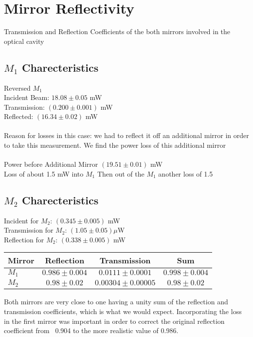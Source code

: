 \documentclass[11pt]{article}
\begin{document}
\section{Mirror Reflectivity}
Transmission and Reflection Coefficients of the both mirrors involved in the optical cavity \\
\subsection{$M_1$ Charecteristics}
Reversed $M_1$ \\ 
Incident Beam:
$18.08 \pm 0.05$ mW \\
Transmission:
$(0.200 \pm 0.001 )$ mW \\
Reflected: 
$(16.34 \pm 0.02)$ mW \\ \ \\
Reason for losses in this case: we had to reflect it off an additional mirror in order to take this measurement. We find the power loss of this additional mirror \\ \ \\ 
Power before Additional Mirror
$(19.51 \pm 0.01)$ mW \\
Loss of about 1.5 mW into $M_1$ 
Then out of the $M_1$ another loss of 1.5 \\
\subsection{$M_2$ Charecteristics}
Incident for $M_2$:
$(0.345 \pm 0.005)$ mW \\
Transmission for $M_2$:
$(1.05 \pm 0.05) \mu$W \\
Reflection for $M_2$:
$(0.338 \pm 0.005)$  mW \\



\begin{center}
	\begin{tabular}{l|ccc}
  Mirror & Reflection & Transmission & Sum \\
  \hline
  $M_1$ & $0.986 \pm 0.004$ & $0.0111 \pm 0.0001$ & $0.998 \pm 0.004$ \\
  $M_2$ & $0.98 \pm 0.02 $ & $0.00304 \pm 0.00005 $ & $0.98 \pm 0.02$ 
\end{tabular}
\end{center}

Both mirrors are very close to one having a unity sum of the reflection and transmission coefficients, which is what we would expect. Incorporating the loss in the first mirror was important in order to correct the original reflection coefficient from ~0.904 to the more realistic value of 0.986. \\
\end{document}
